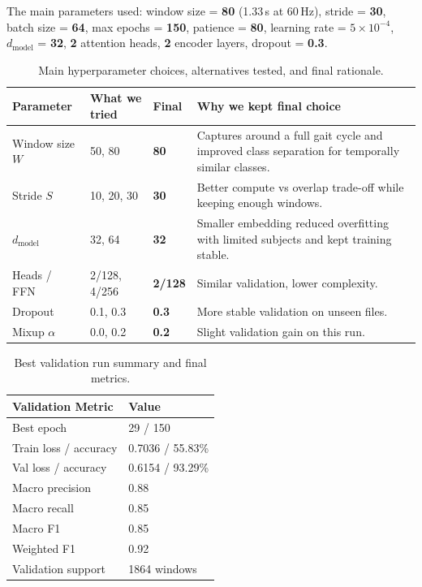 \documentclass[10pt,a4paper,twocolumn]{article}
\begin{document}
The main parameters used: window size = \textbf{80} (1.33\,s at 60\,Hz), stride = \textbf{30}, batch size = \textbf{64}, max epochs = \textbf{150}, patience = \textbf{80}, learning rate = \textbf{$5 \times 10^{-4}$}, $d_{\text{model}}$ = \textbf{32}, \textbf{2} attention heads, \textbf{2} encoder layers, dropout = \textbf{0.3}.

\begin{table}[H]
\centering
\scriptsize
\begin{tabular}{p{1.55cm} p{1.5cm} p{0.9cm} p{2.9cm}}
\toprule
\textbf{Parameter} & \textbf{What we tried} & \textbf{Final} & \textbf{Why we kept final choice} \\
\midrule
Window size $W$ & 50, 80 & \textbf{80} & Captures around a full gait cycle and improved class separation for temporally similar classes. \\
Stride $S$ & 10, 20, 30 & \textbf{30} & Better compute vs overlap trade-off while keeping enough windows. \\
$d_{\text{model}}$ & 32, 64 & \textbf{32} & Smaller embedding reduced overfitting with limited subjects and kept training stable. \\
Heads / FFN & 2/128, 4/256 & \textbf{2/128} & Similar validation, lower complexity. \\
Dropout & 0.1, 0.3 & \textbf{0.3} & More stable validation on unseen files. \\
Mixup $\alpha$ & 0.0, 0.2 & \textbf{0.2} & Slight validation gain on this run. \\
\bottomrule
\end{tabular}
\caption{Main hyperparameter choices, alternatives tested, and final rationale.}
\label{tab:param_choices}
\end{table}

\begin{table}[H]
\centering
\scriptsize
\begin{tabular}{l l}
\toprule
\textbf{Validation Metric} & \textbf{Value} \\
\midrule
Best epoch & 29 / 150 \\
Train loss / accuracy & 0.7036 / 55.83\% \\
Val loss / accuracy & 0.6154 / 93.29\% \\
Macro precision & 0.88 \\
Macro recall & 0.85 \\
Macro F1 & 0.85 \\
Weighted F1 & 0.92 \\
Validation support & 1864 windows \\
\bottomrule
\end{tabular}
\caption{Best validation run summary and final metrics.}
\label{tab:best_val_summary}
\end{table}
\end{document}
